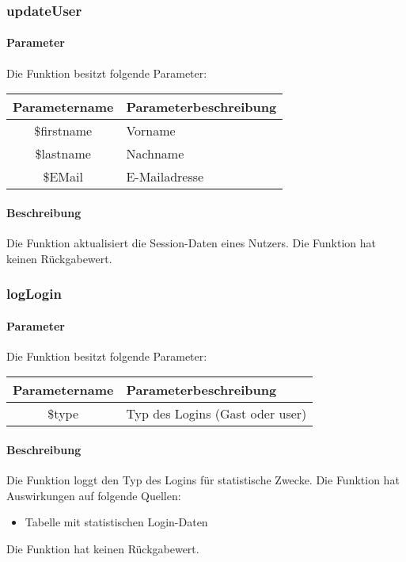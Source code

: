 \subsubsection{updateUser}
\paragraph{Parameter} Die Funktion besitzt folgende Parameter:
\begin{table}[H]
	\begin{tabular}{|c|p{11cm}|}
		\hline
		\textbf{Parametername} & \textbf{Parameterbeschreibung} \\ \hline
		\$firstname & Vorname \\ \hline
		\$lastname  & Nachname \\ \hline
		\$EMail     & E-Mailadresse \\ \hline
	\end{tabular}
\end{table}
\paragraph{Beschreibung} Die Funktion aktualisiert die Session-Daten eines Nutzers. Die Funktion hat keinen Rückgabewert.
\subsubsection{logLogin}
\paragraph{Parameter} Die Funktion besitzt folgende Parameter:
\begin{table}[H]
	\begin{tabular}{|c|p{11cm}|}
		\hline
		\textbf{Parametername} & \textbf{Parameterbeschreibung} \\ \hline
		\$type & Typ des Logins ({\glqq Gast\grqq} oder {\glqq user\grqq}) \\ \hline
	\end{tabular}
\end{table}
\paragraph{Beschreibung} Die Funktion loggt den Typ des Logins für statistische Zwecke. Die Funktion hat Auswirkungen auf folgende Quellen:
\begin{itemize}
	\item Tabelle mit statistischen Login-Daten
\end{itemize}
Die Funktion hat keinen Rückgabewert.